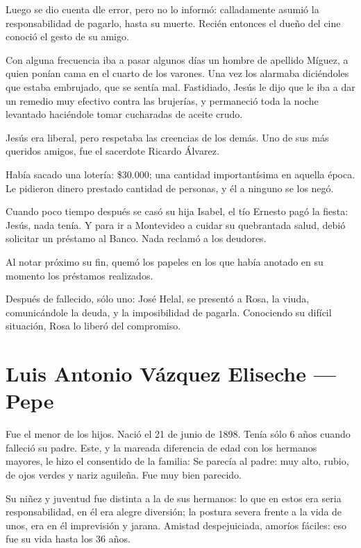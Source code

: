 \documentclass{article}
\begin{document}
\bigbreak{}

Luego se dio cuenta dle error, pero no lo informó: calladamente asumió la responsabilidad de pagarlo, hasta su muerte. Recién entonces el dueño del cine conoció el gesto de su amigo.

Con alguna frecuencia iba a pasar algunos días un hombre de apellido Mí\-guez, a quien ponían cama en el cuarto de los varones. Una vez los alarmaba di\-cién\-do\-les que estaba embrujado, que se sentía mal. Fastidiado, Jesús le dijo que le iba a dar un remedio muy efectivo contra las brujerías, y permaneció toda la noche levantado haciéndole tomar cucharadas de aceite crudo.

\bigbreak{} 

Jesús era liberal, pero respetaba las creencias de los demás. Uno de sus más queridos amigos, fue el sacerdote Ricardo Álvarez.

\bigbreak{}

Había sacado una lotería: \$30.000; una cantidad importantísima en aquella época. Le pidieron dinero prestado cantidad de personas, y él a ninguno se los negó.

Cuando poco tiempo después se casó su hija Isabel, el tío Ernesto pagó la fiesta: Jesús, nada tenía. Y para ir a Montevideo a cuidar su quebrantada salud, debió solicitar un préstamo al Banco. Nada reclamó a los deudores.

Al notar próximo su fin, quemó los papeles en los que había anotado en su momento los préstamos realizados.

Después de fallecido, sólo uno: José Helal, se presentó a Rosa, la viuda, comunicándole la deuda, y la imposibilidad de pagarla. Conociendo su difícil situación, Rosa lo liberó del compromiso.


\section{Luis Antonio Vázquez Eliseche --- Pepe}

Fue el menor de los hijos. Nació el 21 de junio de 1898. Tenía sólo 6 años cuando falleció su padre. Este, y la mareada diferencia de edad con los hermanos mayores, le hizo el consentido de la familia: Se parecía al padre: muy alto, rubio, de ojos verdes y nariz aguileña. Fue muy bien parecido.

Su niñez y juventud fue distinta a la de sus hermanos: lo que en estos era seria responsabilidad, en él era alegre diversión; la postura severa frente a la vida de unos, era en él imprevisión y jarana. Amistad despejuiciada, amoríos fáciles: eso fue su vida hasta los 36 años.
\end{document}
